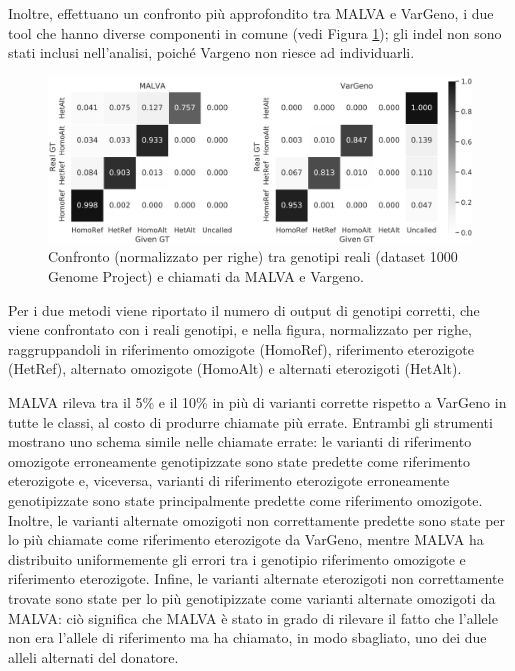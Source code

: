 \documentclass[../main.tex]{subfiles}
\begin{document}
\noindent
Inoltre, \cite{bernardini2019malva} effettuano un confronto più approfondito tra MALVA e VarGeno, i due tool che hanno diverse componenti in comune (vedi Figura \ref{fig:confronto3}); gli indel non sono stati inclusi nell'analisi, poiché Vargeno non riesce ad individuarli.

\begin{figure}[h!]
	\centering
  	\captionsetup{justification=centering}
  	\includegraphics[scale=1.1]{images/confronto3.jpg}
  	\caption{Confronto (normalizzato per righe) tra genotipi reali (dataset 1000 Genome Project) e chiamati da MALVA e Vargeno.}
  	\label{fig:confronto3}
\end{figure}

\noindent
Per i due metodi viene riportato il numero di output di genotipi corretti, che viene confrontato con i reali genotipi, e nella figura, normalizzato per righe, raggruppandoli in riferimento omozigote (HomoRef), riferimento eterozigote (HetRef), alternato omozigote (HomoAlt) e alternati eterozigoti (HetAlt).

MALVA rileva tra il 5\% e il 10\% in più di  varianti corrette rispetto a VarGeno in tutte le classi, al costo di produrre chiamate più errate. Entrambi gli strumenti mostrano uno schema simile nelle chiamate errate: le varianti di riferimento omozigote erroneamente genotipizzate sono state predette come riferimento eterozigote e, viceversa, varianti di riferimento eterozigote erroneamente genotipizzate sono state principalmente predette come riferimento omozigote. Inoltre, le varianti alternate omozigoti non correttamente predette sono state per lo più chiamate come riferimento eterozigote da VarGeno, mentre MALVA ha distribuito uniformemente gli errori tra i genotipio riferimento omozigote e riferimento eterozigote. Infine, le varianti alternate eterozigoti non correttamente trovate sono state per lo più genotipizzate come varianti alternate omozigoti da MALVA: ciò significa che MALVA  è stato in grado di rilevare il fatto che l'allele non era l'allele di riferimento ma ha chiamato, in modo sbagliato, uno dei due alleli alternati del donatore. 
\end{document}
